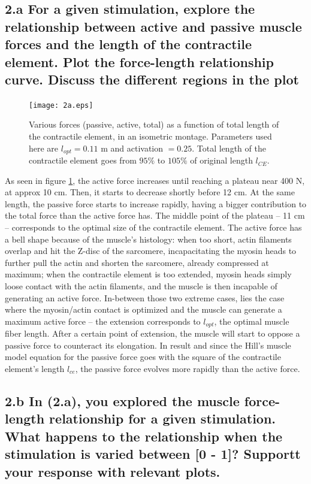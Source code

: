 \documentclass{cmc}
\begin{document}
\subsection*{2.a For a given stimulation, explore the relationship
  between active and passive muscle forces and the length of the
  contractile element.  Plot the force-length relationship curve.
  Discuss the different regions in the plot}

\begin{figure}[H]
\centering
\texttt{[image: 2a.eps]}
\caption{Various forces (passive, active, total) as a function of total length of the contractile element, in an isometric montage. Parameters used here are $l_{opt} = 0.11$ m and activation $=0.25$. Total length of the contractile element goes from $95\%$ to $105\%$ of original length $l_{CE}$.}
\label{figure:2a}
\end{figure}

As seen in figure \ref{figure:2a}, the active force increases until reaching a plateau near 400 N, at approx 10 cm. Then, it starts to decrease shortly before 12 cm. At the same length, the passive force starts to increase rapidly, having a bigger contribution to the total force than the active force has. The middle point of the plateau -- 11 cm -- corresponds to the optimal size of the contractile element. The active force has a bell shape because of the muscle's histology: when too short, actin filaments overlap and hit the Z-disc of the sarcomere, incapacitating the myosin heads to further pull the actin and shorten the sarcomere, already compressed at maximum; when the contractile element is too extended,  myosin heads simply loose contact with the actin filaments, and the muscle is then incapable  of generating an active force. In-between those two extreme cases, lies the case where the myosin/actin contact is optimized and the muscle can generate a maximum active force -- the extension corresponds to $l_{opt}$, the optimal muscle fiber length. After a certain point of extension, the muscle will start to oppose a passive force to counteract its elongation. In result and since the Hill's muscle model equation for the passive force goes with the square of the contractile element's length $l_{ce}$, the passive force evolves more rapidly than the active force.
 
\pagebreak
\subsection*{2.b In (2.a), you explored the muscle force-length
  relationship for a given stimulation. What happens to the
  relationship when the stimulation is varied between [0 - 1]? Supportt
  your response with relevant plots.}
\end{document}
